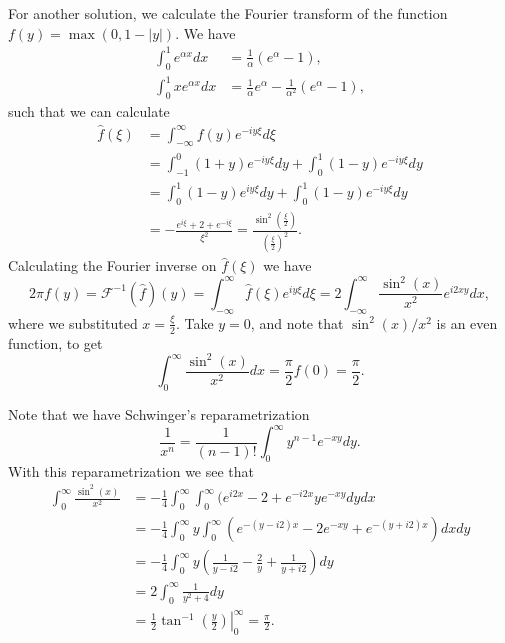 For another solution, we calculate the Fourier transform of the function $f(y) = \max(0, 1 - |y|)$.
We have
\begin{equation*}
    \begin{split}
        \int_0^1 e^{\alpha x} dx &= \frac{1}{\alpha}(e^{\alpha} - 1), \\
        \int_0^1 x e^{\alpha x} dx &= \frac{1}{\alpha} e^{\alpha} - \frac{1}{\alpha^2} (e^{\alpha} - 1),
    \end{split}
\end{equation*}
such that we can calculate
\begin{equation*}
    \begin{split}
        \hat{f}(\xi) &= \int_{-\infty}^{\infty} f(y) e^{-iy\xi} d\xi \\
            &= \int_{-1}^0 (1 + y) e^{-iy\xi} dy + \int_0^1 (1 - y) e^{-iy\xi} dy \\
            &= \int_{0}^1 (1 - y) e^{iy\xi} dy + \int_0^1 (1 - y) e^{-iy\xi} dy \\
            &= -\frac{e^{i\xi} + 2 + e^{-i\xi}}{\xi^2}
            = \frac{\sin^2\left(\frac{\xi}{2}\right)}{\left(\frac{\xi}{2}\right)^2}.
    \end{split}
\end{equation*}
Calculating the Fourier inverse on $\hat{f}(\xi)$ we have
\begin{equation*}
    2\pi f(y) = \mathcal{F}^{-1}(\hat{f})(y)
        = \int_{-\infty}^{\infty} \hat{f}(\xi) e^{iy\xi} d\xi
        = 2 \int_{-\infty}^{\infty} \frac{\sin^2(x)}{x^2} e^{i2xy} dx,
\end{equation*}
where we substituted $x = \frac{\xi}{2}$.
Take $y = 0$, and note that $\sin^2(x)/x^2$ is an even function, to get
\begin{equation*}
    \int_0^{\infty} \frac{\sin^2(x)}{x^2} dx = \frac{\pi}{2} f(0) = \frac{\pi}{2}.
\end{equation*}


Note that we have Schwinger's reparametrization
\begin{equation*}
    \frac{1}{x^n} = \frac{1}{(n - 1)!} \int_0^{\infty} y^{n-1} e^{-xy} dy.
\end{equation*}
With this reparametrization we see that
\begin{equation*}
    \begin{split}
        \int_0^{\infty} \frac{\sin^2(x)}{x^2}
            &= -\frac{1}{4} \int_0^{\infty} \int_0^{\infty} (e^{i2x} - 2 + e^{-i2x} y e^{-xy} dy dx \\
            &= -\frac{1}{4} \int_0^{\infty} y \int_0^{\infty} (e^{-(y - i2)x} - 2e^{-xy} + e^{-(y + i2)x}) dx dy \\
            &= -\frac{1}{4} \int_0^{\infty} y \left( \frac{1}{y - i2} - \frac{2}{y} + \frac{1}{y + i2} \right) dy \\
            &= 2 \int_0^{\infty} \frac{1}{y^2 + 4} dy \\
            &= \left. \frac{1}{2} \tan^{-1}\left(\frac{y}{2}\right) \right|_0^{\infty}
            = \frac{\pi}{2}.
    \end{split}
\end{equation*}


